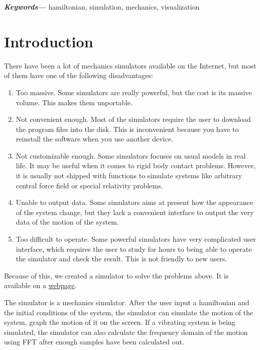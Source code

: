 \documentclass[12pt]{article}
\providecommand{\keywords}[1]{\small\textbf{\textit{Keywords---}} #1}
\begin{document}
\keywords{hamiltonian, simulation, mechanics, visualization}

\tableofcontents

\section{Introduction}
\label{sec:intro}

There have been a lot of mechanics simulators available on the Internet,
but most of them have one of the following disadvantages:
\begin{enumerate}
  \item Too massive.
  Some simulators are really powerful, but the cost is its massive volume.
  This makes them unportable.

  \item Not convenient enough.
  Most of the simulators require the user to download the program files into the disk.
  This is inconvenient because you have to reinstall the software when you use another device.

  \item Not customizable enough.
  Some simulators focuses on usual models in real life.
  It may be useful when it comes to rigid body contact problems.
  However, it is usually not shipped with functions to simulate systems like arbitrary central force field or special relativity problems.

  \item Unable to output data.
  Some simulators aims at present how the appearance of the system change,
  but they lack a convenient interface to output the very data of the motion of the system.

  \item Too difficult to operate.
  Some powerful simulators have very complicated user interface,
  which requires the user to study for hours to being able to operate the simulator and check the result.
  This is not friendly to new users.
\end{enumerate}

Because of this, we created a simulator to solve the problems above.
It is available on a
\href{https://UlyssesZh.github.io/rpg/mechsimul2}{webpage}.

The simulator is a mechanics simulator.
After the user input a hamiltonian and the initial conditions of the system,
the simulator can simulate the motion of the system,
graph the motion of it on the screen.
If a vibrating system is being simulated,
the simulator can also calculate the frequency domain of the motion using FFT after enough samples have been calculated out.
\end{document}
